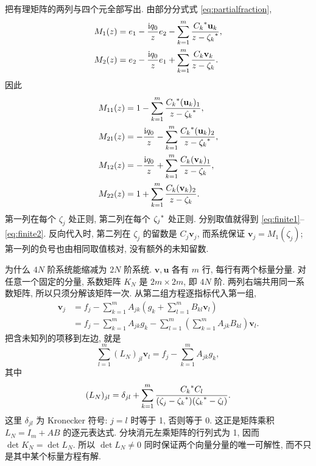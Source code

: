 \par\smallskip\noindent 把有理矩阵的两列与四个元全部写出.\quad
由部分分式式 \eqref{eq:partialfraction},
\begin{equation*}
\begin{aligned}
M_1(z)&=e_1-\dfrac{\mathrm{i} q_0}{z}e_2
-\sum\limits_{k=1}^{m}\dfrac{{C_k}^{*}\mathbf u_k}{z-{\zeta_k}^{*}},\\
M_2(z)&=e_2-\dfrac{\mathrm{i} q_0}{z}e_1
+\sum\limits_{k=1}^{m}\dfrac{C_k\mathbf v_k}{z-\zeta_k}.
\end{aligned}
\end{equation*}
因此
\begin{equation*}
\begin{aligned}
M_{11}(z)&=1-\sum\limits_{k=1}^{m}
\dfrac{{C_k}^{*}(\mathbf u_k)_1}{z-{\zeta_k}^{*}},\\
M_{21}(z)&=-\dfrac{\mathrm{i} q_0}{z}-\sum\limits_{k=1}^{m}
\dfrac{{C_k}^{*}(\mathbf u_k)_2}{z-{\zeta_k}^{*}},\\
M_{12}(z)&=-\dfrac{\mathrm{i} q_0}{z}+\sum\limits_{k=1}^{m}
\dfrac{C_k(\mathbf v_k)_1}{z-\zeta_k},\\
M_{22}(z)&=1+\sum\limits_{k=1}^{m}
\dfrac{C_k(\mathbf v_k)_2}{z-\zeta_k}.
\end{aligned}
\end{equation*}
第一列在每个 $\zeta_j$ 处正则, 第二列在每个 ${\zeta_j}^{*}$ 处正则.
分别取值就得到 \eqref{eq:finite1}--\eqref{eq:finite2}.
反向代入时, 第二列在 $\zeta_j$ 的留数是 $C_j\mathbf v_j$,
而系统保证 $\mathbf v_j=M_1(\zeta_j)$;
第一列的负号也由相同取值核对, 没有额外的未知留数.

\par\smallskip\noindent 为什么 $4N$ 阶系统能缩减为 $2N$ 阶系统.\quad
$\boldsymbol v,\boldsymbol u$ 各有 $m$ 行, 每行有两个标量分量.
对任意一个固定的分量, 系数矩阵 $K_N$ 是 $2m\times2m$, 即 $4N$ 阶.
两列右端共用同一系数矩阵, 所以只须分解该矩阵一次.
从第二组方程逐指标代入第一组,
\begin{equation*}
\begin{aligned}
\mathbf v_j
&=f_j-\sum\limits_{k=1}^{m}A_{jk}
\left(g_k+\sum\limits_{l=1}^{m}B_{kl}\mathbf v_l\right)\\
&=f_j-\sum\limits_{k=1}^{m}A_{jk}g_k
-\sum\limits_{l=1}^{m}\left(\sum\limits_{k=1}^{m}A_{jk}B_{kl}\right)\mathbf v_l.
\end{aligned}
\end{equation*}
把含未知列的项移到左边, 就是
\begin{equation*}
\sum\limits_{l=1}^{m}(L_N)_{jl}\mathbf v_l
=f_j-\sum\limits_{k=1}^{m}A_{jk}g_k,
\end{equation*}
其中
\begin{equation*}
(L_N)_{jl}=\delta_{jl}+
\sum\limits_{k=1}^{m}
\dfrac{{C_k}^{*}C_l}
{(\zeta_j-{\zeta_k}^{*})({\zeta_k}^{*}-\zeta_l)}.
\end{equation*}
这里 $\delta_{jl}$ 为 Kronecker 符号: $j=l$ 时等于 1, 否则等于 0.
这正是矩阵乘积 $L_N=I_m+AB$ 的逐元表达式.
分块消元左乘矩阵的行列式为 1, 因而
$\det K_N=\det L_N$.
所以 $\det L_N\ne0$ 同时保证两个向量分量的唯一可解性,
而不只是其中某个标量方程有解.

